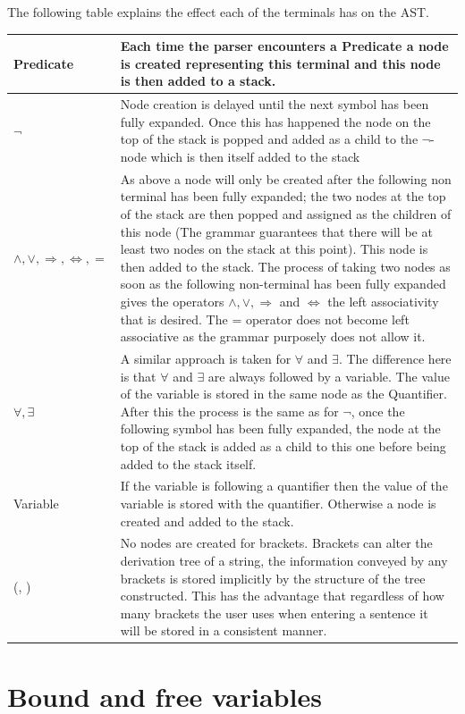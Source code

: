 The following table explains the effect each of the terminals has on the AST.
\\
\begin{tabular}{|l | p{10cm}|}
\hline
Predicate & Each time the parser encounters a Predicate a node is created representing this terminal and this node is then added to a stack. \\ \hline
$\lnot$ &  Node creation is delayed until the next symbol has been fully expanded. Once this has happened the node on the top of the stack is popped and added as a child to the $\lnot$-node which is then itself added to the stack \\ \hline
$\land, \lor, \Rightarrow, \Leftrightarrow, =$ &  As above a node will only be created after the following non terminal has been fully expanded; the two nodes at the top of the stack are then popped and assigned as the children of this node (The grammar guarantees that there will be at least two nodes on the stack at this point). This node is then added to the stack. The process of taking two nodes as soon as the following non-terminal has been fully expanded gives the operators $\land, \lor, \Rightarrow$ and $\Leftrightarrow$ the left associativity that is desired. The = operator does not become left associative as the grammar purposely does not allow it. \\ \hline
$\forall, \exists$ & A similar approach is taken for $\forall$ and $\exists$. The difference here is that $\forall$ and $\exists$ are always followed by a variable. The value of the variable is stored in the same node as the Quantifier. After this the process is the same as for $\lnot$,  once the following symbol has been fully expanded, the node at the top of the stack is added as a child to this one before being added to the stack itself. \\ \hline
Variable & If the variable is following a quantifier then the value of the variable is stored with the quantifier. Otherwise a node is created and added to the stack. \\ \hline
(, ) & No nodes are created for brackets. Brackets can alter the derivation tree of a string, the information conveyed  by any brackets is stored implicitly by the structure of the tree constructed. This has the advantage that regardless of how many brackets the user uses when entering a sentence it will be stored in a consistent manner. \\ \hline
\end{tabular}

\section{Bound and free variables}

